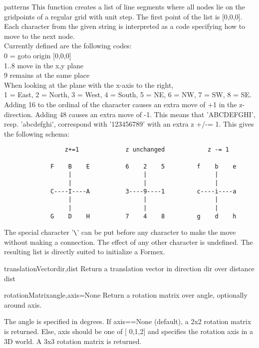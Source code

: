 {{\begin{funcdesc}{pattern}{s}
This function creates a list of line segments where all nodes lie on the gridpoints of a regular grid with unit step.
The first point of the list is [0,0,0]. Each character from the given string is interpreted as a code specifying how to move to the next node.\\
Currently defined are the following codes:\\
0 = goto origin [0,0,0]\\
1..8 move in the x,y plane\\
9 remains at the same place\\
When looking at the plane with the x-axis to the right,\\
1 = East, 2 = North, 3 = West, 4 = South, 5 = NE, 6 = NW, 7 = SW, 8 = SE.\\
Adding 16 to the ordinal of the character causes an extra move of +1 in the z-direction. Adding 48 causes an extra move of -1. This means that 'ABCDEFGHI', resp. 'abcdefghi', correspond with '123456789' with an extra z +/-= 1. This gives the following schema:
\begin{verbatim}
                 z+=1             z unchanged            z -= 1
            
             F    B    E          6    2    5         f    b    e 
                  |                    |                   |     
                  |                    |                   |     
             C----I----A          3----9----1         c----i----a  
                  |                    |                   |     
                  |                    |                   |     
             G    D    H          7    4    8         g    d    h
\end{verbatim}             
The special character '\verb?\?' can be put before any character to make the move without making a connection. The effect of any other character is undefined. The resulting list is directly suited to initialize a Formex.
\end{funcdesc}


\begin{funcdesc}{translationVector}{dir,dist}
    Return a translation vector in direction dir over distance dist
\end{funcdesc}

\begin{funcdesc}{rotationMatrix}{angle,axis=None}
    Return a rotation matrix over angle, optionally around axis.

    The angle is specified in degrees.
    If axis==None (default), a 2x2 rotation matrix is returned.
    Else, axis should be one of [ 0,1,2] and specifies the rotation axis
    in a 3D world. A 3x3 rotation matrix is returned.
\end{funcdesc}
    

}}
